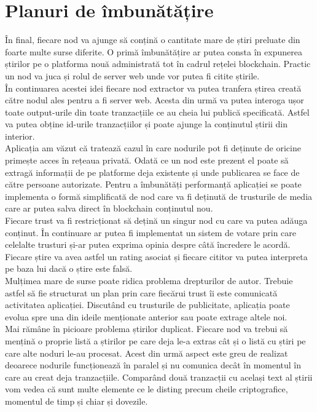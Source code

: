 \clearpage

\section{Planuri de îmbunătățire}

În final, fiecare nod va ajunge să conțină o cantitate mare de știri preluate din foarte multe surse diferite. O primă îmbunătățire ar putea consta în expunerea știrilor pe o platforma nouă administrată tot în cadrul rețelei blockchain. Practic un nod va juca și rolul de server web unde vor putea fi citite știrile.\\

În continuarea acestei idei fiecare nod extractor va putea tranfera știrea creată către nodul ales pentru a fi server web. Acesta din urmă va putea interoga ușor toate output-urile din toate tranzacțiile ce au cheia lui publică specificată. Astfel va putea obține id-urile tranzacțiilor și poate ajunge la conținutul știrii din interior.\\

Aplicația am văzut că tratează cazul în care nodurile pot fi deținute de oricine primește acces în rețeaua privată. Odată ce un nod este prezent el poate să extragă informații de pe platforme deja existente și unde publicarea se face de către persoane autorizate. Pentru a îmbunătăți performanță aplicației se poate implementa o formă simplificată de nod care va fi deținută de trusturile de media care ar putea salva direct în blockchain conținutul nou.\\

Fiecare trust va fi restricționat să dețină un singur nod cu care va putea adăuga conținut. În continuare ar putea fi implementat un sistem de votare prin care celelalte trusturi și-ar putea exprima opinia despre câtă încredere le acordă. Fiecare știre va avea astfel un rating asociat și fiecare cititor va putea interpreta pe baza lui dacă o știre este falsă.\\

Mulțimea mare de surse poate ridica problema drepturilor de autor. Trebuie astfel să fie structurat un plan prin care fiecărui trust îi este comunicată activitatea aplicației. Discutând cu trusturile de publicitate, aplicația poate evolua spre una din ideile menționate anterior sau poate extrage altele noi.\\

Mai rămâne în picioare problema știrilor duplicat. Fiecare nod va trebui să mențină o proprie listă a știrilor pe care deja le-a extras cât și o listă cu știri pe care alte noduri le-au procesat. Acest din urmă aspect este greu de realizat deoarece nodurile funcționează în paralel și nu comunica decât în momentul în care au creat deja tranzacțiile. Comparând două tranzacții cu același text al știrii vom vedea că sunt multe elemente ce le disting precum cheile criptografice, momentul de timp și chiar și dovezile.\\

